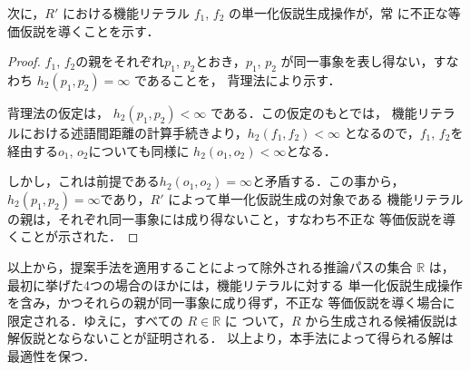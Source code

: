 \documentclass[japanese]{jnlp_1.4}
\begin{document}
次に，$R'$ における機能リテラル $f_1$, $f_2$ の単一化仮説生成操作が，常
に不正な等価仮説を導くことを示す．

\begin{proof}
$f_1$, $f_2$の親をそれぞれ$p_1$, $p_2$とおき，$p_1$, $p_2$
が同一事象を表し得ない，すなわち $h_2(p_1,p_2) = \infty$ であることを，
背理法により示す．

背理法の仮定は， $h_2(p_1,p_2) < \infty$ である．この仮定のもとでは，
機能リテラルにおける述語間距離の計算手続きより，$h_2(f_1,f_2) <
\infty$ となるので，$f_1$, $f_2$を経由する$o_1$, $o_2$についても同様に
$h_2(o_1,o_2) < \infty$となる．

しかし，これは前提である$h_2(o_1,o_2) = \infty$と矛盾する．この事から，
$h_2(p_1,p_2) = \infty$であり，$R'$ によって単一化仮説生成の対象である
機能リテラルの親は，それぞれ同一事象には成り得ないこと，すなわち不正な
等価仮説を導くことが示された．
\end{proof}

以上から，提案手法を適用することによって除外される推論パスの集合
$\mathbb{R}$ は，最初に挙げた4つの場合のほかには，機能リテラルに対する
単一化仮説生成操作を含み，かつそれらの親が同一事象に成り得ず，不正な
等価仮説を導く場合に限定される．ゆえに，すべての $R \in \mathbb{R}$ に
ついて，$R$ から生成される候補仮説は解仮説とならないことが証明される．
以上より，本手法によって得られる解は最適性を保つ．



\begin{biography}
\end{biography}


\biodate





\clearpage





























\clearpage
\end{document}
